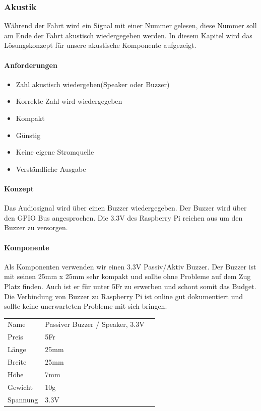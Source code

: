 \documentclass[../../main.tex]{subfiles}
\begin{document}
\subsubsection{Akustik}
Während der Fahrt wird ein Signal mit einer Nummer gelesen, diese Nummer soll am Ende der Fahrt akustisch wiedergegeben werden. In diesem Kapitel wird das Lösungskonzept für unsere akustische Komponente aufgezeigt.

\paragraph{Anforderungen}
\begin{itemize}
    \item Zahl akustisch wiedergeben(Speaker oder Buzzer)
    \item Korrekte Zahl wird wiedergegeben
    \item Kompakt
    \item Günstig
    \item Keine eigene Stromquelle
    \item Verständliche Ausgabe
\end{itemize}

\paragraph{Konzept}
Das Audiosignal wird über einen Buzzer wiedergegeben. Der Buzzer wird über den GPIO Bus angesprochen. Die 3.3V des Raspberry Pi reichen aus um den Buzzer zu versorgen.

\paragraph{Komponente}
Als Komponenten verwenden wir einen 3.3V Passiv/Aktiv Buzzer. Der Buzzer ist mit seinen 25mm x 25mm sehr kompakt und sollte ohne Probleme auf dem Zug Platz finden. Auch ist er für unter 5Fr zu erwerben und schont somit das Budget. Die Verbindung von Buzzer zu Raspberry Pi ist online gut dokumentiert und sollte keine unerwarteten Probleme mit sich bringen.

\begin{table}[] \centering
\begin{tabular}{lll}
Name & Passiver Buzzer / Speaker, 3.3V \\
Preis & 5Fr    \\
Länge & 25mm    \\
Breite & 25mm   \\
Höhe & 7mm      \\
Gewicht & 10g   \\
Spannung & 3.3V \\
\end{tabular}
\end{table}
\end{document}
